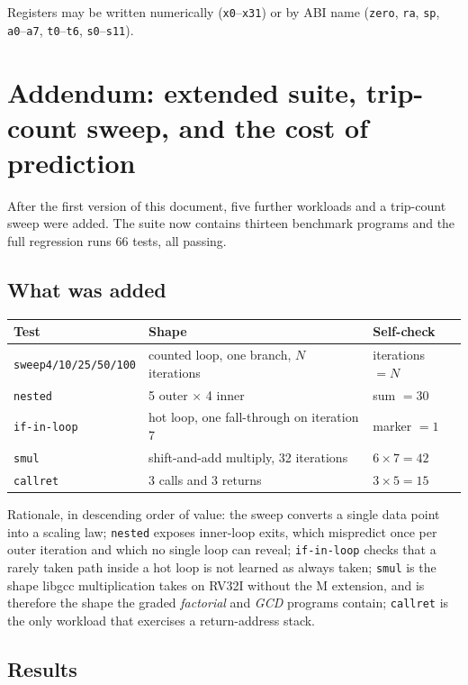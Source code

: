 \documentclass[11pt]{article}
\begin{document}
Registers may be written numerically (\texttt{x0}--\texttt{x31}) or by ABI name
(\texttt{zero}, \texttt{ra}, \texttt{sp}, \texttt{a0}--\texttt{a7}, \texttt{t0}--\texttt{t6},
\texttt{s0}--\texttt{s11}).


\section{Addendum: extended suite, trip-count sweep, and the cost of prediction}

After the first version of this document, five further workloads and a trip-count sweep
were added. The suite now contains thirteen benchmark programs and the full regression
runs 66 tests, all passing.

\subsection{What was added}

\begin{center}
\begin{tabular}{lll}
\hline
Test & Shape & Self-check \\
\hline
\texttt{sweep4/10/25/50/100} & counted loop, one branch, $N$ iterations & iterations $=N$ \\
\texttt{nested} & 5 outer $\times$ 4 inner & sum $=30$ \\
\texttt{if-in-loop} & hot loop, one fall-through on iteration 7 & marker $=1$ \\
\texttt{smul} & shift-and-add multiply, 32 iterations & $6\times 7 = 42$ \\
\texttt{callret} & 3 calls and 3 returns & $3\times 5 = 15$ \\
\hline
\end{tabular}
\end{center}

Rationale, in descending order of value: the sweep converts a single data point into a
scaling law; \texttt{nested} exposes inner-loop exits, which mispredict once per outer
iteration and which no single loop can reveal; \texttt{if-in-loop} checks that a rarely
taken path inside a hot loop is not learned as always taken; \texttt{smul} is the shape
libgcc multiplication takes on RV32I without the M extension, and is therefore the shape
the graded \emph{factorial} and \emph{GCD} programs contain; \texttt{callret} is the only
workload that exercises a return-address stack.

\subsection{Results}
\end{document}
